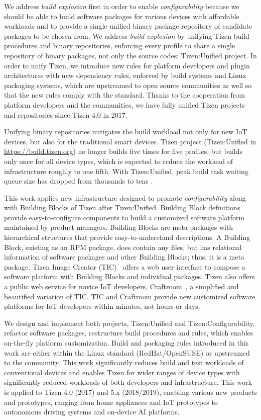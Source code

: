 We address \textit{build explosion} first in order to enable \textit{configurability} because we should be able to build software packages for various devices with affordable workloads and to provide a single unified binary package repository of candidate packages to be chosen from.
We address \textit{build explosion} by unifying Tizen build procedures and binary repositories, enforcing every profile to share a single repository of binary packages, not only the source codes: Tizen:Unified project.
In order to unify Tizen, we introduce new rules for platform developers and plugin architectures with new dependency rules, enforced by build systems and Linux packaging systems, which are upstreamed to open source communities as well so that the new rules comply with the standard.
Thanks to the cooperation from platform developers and the communities, we have fully unified Tizen projects and repositories since Tizen 4.0 in 2017.


Unifying binary repositories mitigates the build workload not only for new IoT devices, but also for the traditional smart devices.
Tizen project (Tizen:Unified in \url{https://build.tizen.org}) no longer builds five times for five profiles, but builds only once for all device types, which is expected to reduce the workload of infrastructure roughly to one fifth.
With Tizen:Unified, peak build task waiting queue size has dropped from thousands to tens \cite{2Ham2017TDC}.


This work applies new infrastructure designed to promote \textit{configurability} along with Building Blocks of Tizen after Tizen:Unified.
Building Block definitions~\cite{3TizenWikiBB,4LeeKeynote2017TDC} provide easy-to-configure components to build a customized software platform maintained by product managers.
Building Blocks are meta packages with hierarchical structures that provide easy-to-understand descriptions.
A Building Block, existing as an RPM package, does contain any files, but has relational information of software packages and other Building Blocks; thus, it is a meta package.
Tizen Image Creator (TIC)~\cite{2Ham2017TDC} offers a web user interface to compose a software platform with Building Blocks and individual packages.
Tizen also offers a public web service for novice IoT developers, Craftroom~\cite{5CraftroomURL}, a simplified and beautified variation of TIC.
TIC and Craftroom provide new customized software platforms for IoT developers within minutes, not hours or days.


We design and implement both projects, Tizen:Unified and Tizen:Configurability, refactor software packages, restructure build procedures and rules, which enables on-the-fly platform customization.
Build and packaging rules introduced in this work are either within the Linux standard (RedHat/OpenSUSE) or upstreamed to the community.
This work significantly reduces build and test workloads of conventional devices and enables Tizen for wider ranges of device types with significantly reduced workloads of both developers and infrastructure.
This work is applied to Tizen 4.0 (2017) and 5.x (2018/2019), enabling various new products and prototypes, ranging from home appliances and IoT prototypes to autonomous driving systems and on-device AI platforms.